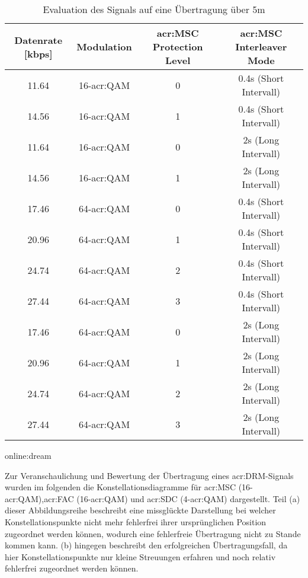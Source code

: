 \begin{table}[H]
	\begin{center}
		\begin{tabular}{cccc}
			\toprule
			\textbf{Datenrate [kbps]} & \textbf{Modulation}& \textbf{\gls{acr:MSC} Protection Level} & \textbf{\gls{acr:MSC} Interleaver Mode}\\
			\midrule
			11.64 & 16-\gls{acr:QAM} & 0 & 0.4s (Short Intervall)\\
			14.56 &16-\gls{acr:QAM} & 1 & 0.4s (Short Intervall)\\
			11.64 & 16-\gls{acr:QAM} & 0 & 2s (Long Intervall)\\
			14.56 & 16-\gls{acr:QAM} & 1 & 2s (Long Intervall) \\
			17.46 & 64-\gls{acr:QAM} & 0 & 0.4s (Short Intervall)\\
			20.96 & 64-\gls{acr:QAM} & 1 & 0.4s (Short Intervall)\\
			24.74 & 64-\gls{acr:QAM} & 2 & 0.4s (Short Intervall)\\
			27.44 & 64-\gls{acr:QAM} & 3 & 0.4s (Short Intervall) \\
			17.46 & 64-\gls{acr:QAM} & 0 & 2s (Long Intervall)\\
			20.96 & 64-\gls{acr:QAM} & 1 & 2s (Long Intervall)\\
			24.74 & 64-\gls{acr:QAM} & 2 & 2s (Long Intervall)\\
			27.44 & 64-\gls{acr:QAM} & 3 & 2s (Long Intervall) \\
			\bottomrule
		\end{tabular}
		\caption{Evaluation des Signals auf eine Übertragung über 5m}\gls{online:dream}
		\label{tab:drmevaluationmax}
	\end{center}
\end{table}





Zur Veranschaulichung und Bewertung der Übertragung eines \gls{acr:DRM}-Signals wurden im folgenden die Konstellationsdiagramme für \gls{acr:MSC} (16-\gls{acr:QAM}),\gls{acr:FAC} (16-\gls{acr:QAM}) und \gls{acr:SDC} (4-\gls{acr:QAM}) dargestellt. Teil (a) dieser Abbildungsreihe beschreibt eine missglückte Darstellung bei welcher Konstellationspunkte nicht mehr fehlerfrei ihrer ursprünglichen Position zugeordnet werden können, wodurch eine fehlerfreie Übertragung nicht zu Stande kommen kann. (b) hingegen beschreibt den erfolgreichen Übertragungsfall, da hier Konstellationspunkte nur kleine Streuungen erfahren und noch relativ fehlerfrei zugeordnet werden können.

